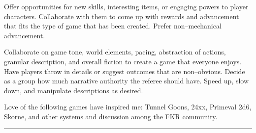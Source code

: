 \documentclass{article}
\begin{document}
\begin{multicols}{2}
  
  Offer opportunities for new skills, interesting items, or engaging powers to player characters.
  Collaborate with them to come up with rewards and advancement that fits the type of game that has been created.
  Prefer non--mechanical advancement. \\


  Collaborate on game tone, world elements, pacing, abstraction of actions, granular description, and overall fiction to create a game that everyone enjoys.
  Have players throw in details or suggest outcomes that are non--obvious.
  Decide as a group how much narrative authority the referee should have.
  Speed up, slow down, and manipulate descriptions as desired. \\


  Love of the following games have inspired me: Tunnel Goons, 24xx, Primeval 2d6, Skorne, and other systems and discussion among the FKR community.

  


\end{multicols} \hrule
 \vfill
\end{document}
